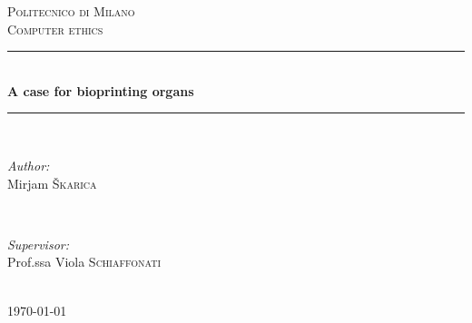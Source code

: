 \documentclass[12pt]{article} %
\begin{document}

\begin{titlepage}

\newcommand{\HRule}{\rule{\linewidth}{0.5mm}} %

\center %

\textsc{\LARGE Politecnico di Milano}\\[1.5cm] %
\textsc{\large Computer ethics}\\[0.5cm] %

\HRule \\[0.4cm]
{ \huge \bfseries A case for bioprinting organs}\\[0.4cm] %
\HRule \\[1.5cm]

\begin{minipage}{0.4\textwidth}
\begin{flushleft} \large
\emph{Author:}\\
Mirjam \textsc{Škarica} %
\end{flushleft}
\end{minipage}
~
\begin{minipage}{0.4\textwidth}
\begin{flushright} \large
\emph{Supervisor:} \\
Prof.ssa Viola  \textsc{Schiaffonati} %
\end{flushright}
\end{minipage}\\[4cm]

{\large \today}\\[3cm] %


\vfill %

\end{titlepage}

\end{document}
